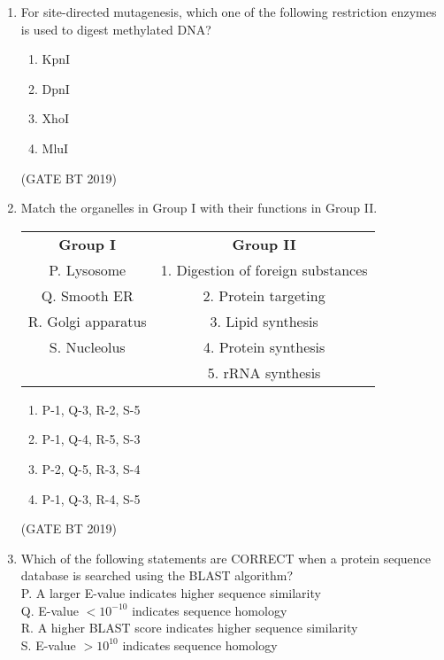\documentclass[journal,12pt,onecolumn]{IEEEtran}
\begin{document}
\begin{enumerate}
\item For site-directed mutagenesis, which one of the following restriction enzymes is used to digest methylated DNA?

\begin{multicols}{4}
\begin{enumerate}
\item KpnI
\item DpnI
\item XhoI
\item MluI
\end{enumerate}
\end{multicols}\hfill(GATE BT 2019)

\item Match the organelles in Group I with their functions in Group II. \\[6pt]

\begin{tabular}{c c}
\textbf{Group I} & \textbf{Group II} \\
P. Lysosome & 1. Digestion of foreign substances \\
Q. Smooth ER & 2. Protein targeting \\
R. Golgi apparatus & 3. Lipid synthesis \\
S. Nucleolus & 4. Protein synthesis \\
 & 5. rRNA synthesis \\
\end{tabular}

\begin{multicols}{2}
\begin{enumerate}
\item P-1, Q-3, R-2, S-5
\item P-1, Q-4, R-5, S-3
\item P-2, Q-5, R-3, S-4
\item P-1, Q-3, R-4, S-5
\end{enumerate}
\end{multicols}\hfill(GATE BT 2019)

\item Which of the following statements are CORRECT when a protein sequence database is searched using the BLAST algorithm? \\[6pt]

P. A larger E-value indicates higher sequence similarity \\
Q. E-value $< 10^{-10}$ indicates sequence homology \\
R. A higher BLAST score indicates higher sequence similarity \\
S. E-value $> 10^{10}$ indicates sequence homology


\end{enumerate}
\end{document}
